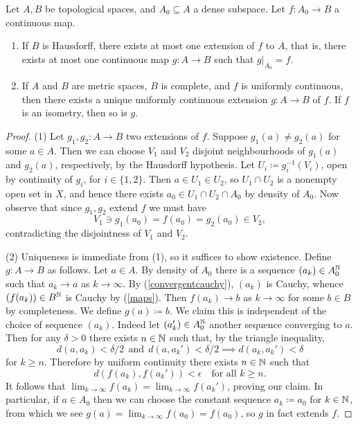 \begin{lemma}
  Let $A,B$ be topological spaces, and $A_0 \subseteq A$ a dense
  subspace. Let $f : A_0 \to B$ a continuous map.
  \begin{enumerate}
  \item If $B$ is Hausdorff, there exists at most one extension of $f$
    to $A$, that is, there exists at most one continuous map $g : A
    \to B$ such that $g|_{A_0} = f$.
  \item If $A$ and $B$ are metric spaces, $B$ is complete, and $f$ is
    uniformly continuous, then there exists a unique uniformly
    continuous extension $g : A \to B$ of $f$. If $f$ is an isometry,
    then so is $g$.
  \end{enumerate}
\end{lemma}

\begin{proof}
  (1) Let $g_1,g_2 : A \to B$ two extensions of $f$. Suppose $g_1(a)
  \ne g_2(a)$ for some $a \in A$. Then we can choose $V_1$ and $V_2$
  disjoint neighbourhoods of $g_1(a)$ and $g_2(a)$, respectively, by
  the Hausdorff hypothesis. Let $U_i \coloneqq g_i^{-1}(V_i)$, open by
  continuity of $g_i$, for $i \in \{1,2\}$. Then $a \in U_1 \in U_2$,
  so $U_1 \cap U_2$ is a nonempty open set in $X$, and hence there
  exists $a_0 \in U_1 \cap U_2 \cap A_0$ by density of $A_0$. Now
  observe that since $g_1,g_2$ extend $f$ we must have
  \[
  V_1 \ni g_1(a_0) = f(a_0) = g_2(a_0) \in V_2,
  \]
  contradicting the disjointness of $V_1$ and $V_2$.

  (2) Uniqueness is immediate from (1), so it suffices to show
  existence. Define $g : A \to B$ as follows. Let $a \in A$. By
  density of $A_0$ there is a sequence $(a_k) \in A_0^{\mathbb{N}}$ such that
  $a_k \to a$ as $k \to \infty$. By (\ref{convergentcauchy}), $(a_k)$
  is Cauchy, whence $(f(a_k)) \in B^{\mathbb{N}}$ is Cauchy by
  (\ref{maps}). Then $f(a_k) \to b$ as $k \to \infty$ for some $b \in
  B$ by completeness. We define $g(a) \coloneqq b$. We claim this is
  independent of the choice of sequence $(a_k)$. Indeed let $(a_k')
  \in A_0^{\mathbb{N}}$ another sequence converging to $a$. Then for any $\delta
  > 0$ there exists $n \in \mathbb{N}$ such that, by the triangle inequality,
  \[
  d(a,a_k) < \delta/2\ \ \text{and}\ \ d(a,a_k') < \delta/2 \implies
  d(a_k,a_k') < \delta
  \]
  for $k \ge n$. Therefore by uniform continuity there exists $n \in
  \mathbb{N}$ such that
  \[
  d(f(a_k),f(a_k')) < \epsilon \quad\text{for all }k \ge n.
  \]
  It follows that $\lim_{k \to \infty} f(a_k) = \lim_{k \to \infty}
  f(a_k')$, proving our claim. In particular, if $a \in A_0$ then we
  can choose the constant sequence $a_k \coloneqq a_0$ for $k \in \mathbb{N}$,
  from which we see $g(a) = \lim_{k \to \infty} f(a_0) = f(a_0)$, so
  $g$ in fact extends $f$.


\end{proof}
